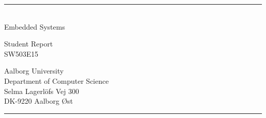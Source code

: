 \begin{titlepage}
    \addtolength{\hoffset}{0.5\evensidemargin-0.5\oddsidemargin}
    \noindent
    \vspace{1.5cm}
    \begin{center}
        \begin{spacing}{2.65} 
            \titlefont
            \TITLE
        \end{spacing}
        \vspace{-20pt}
        \textcolor{aaublue}{\rule{120pt}{2pt}}\\
        \vspace{10pt}
        {\subtitlefont
            Embedded Systems
        }
    \end{center}
    \vspace{4cm}
    \begin{center}
        \begin{spacing}{2}
            \subtitlefont
            Student Report\\
            SW503E15
        \end{spacing}
    \end{center}
    \vfill
    \noindent
\hfill
\begin{minipage}{0.5\linewidth}
    \begin{flushright}
        Aalborg University\\
        Department of Computer Science\\
        Selma Lagerl{\"o}fs Vej 300\\
        DK-9220 Aalborg {\O}st
    \end{flushright}
\end{minipage}
%
\begin{minipage}{0.02\linewidth}
    \textcolor{aaublue}{\rule{1pt}{5\baselineskip}}
\end{minipage}
    \titlepagedecoration
\end{titlepage}
\clearpage 